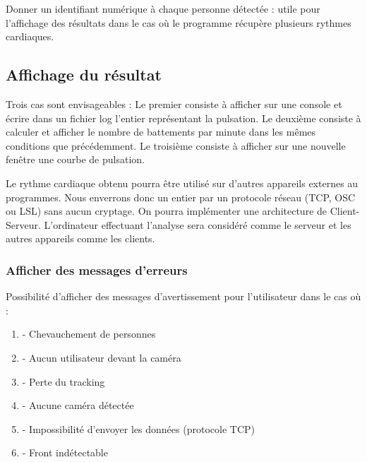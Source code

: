 \documentclass[12pt,a4paper]{article}
\begin{document}
Donner un identifiant numérique à chaque personne détectée : utile pour l'affichage des résultats dans le cas où le programme récupère plusieurs rythmes cardiaques.


\subsection{Affichage du résultat}

Trois cas sont envisageables : Le premier consiste à afficher sur une console et écrire dans un fichier log l'entier représentant la pulsation.
Le deuxième consiste à calculer et afficher le nombre de battements par minute dans les mêmes conditions que précédemment. Le troisième consiste à afficher sur une nouvelle fenêtre une courbe de pulsation.

Le rythme cardiaque obtenu pourra être utilisé sur d'autres appareils externes au programmes. 
Nous enverrons donc un entier par un protocole réseau (TCP, OSC ou LSL) sans aucun cryptage.
On pourra implémenter une architecture de Client-Serveur. L'ordinateur effectuant l'analyse sera considéré comme le serveur et les autres appareils comme les clients.

\subsubsection{Afficher des messages d'erreurs}

Possibilité d'afficher des messages d'avertissement pour l'utilisateur dans le cas où :

\begin{enumerate}
\item [] - Chevauchement de personnes
\item [] - Aucun utilisateur devant la caméra
\item [] - Perte du tracking
\item [] - Aucune caméra détectée 
\item [] - Impossibilité d'envoyer les données (protocole TCP)
\item [] - Front indétectable

\end{enumerate}
\newpage
\end{document}
